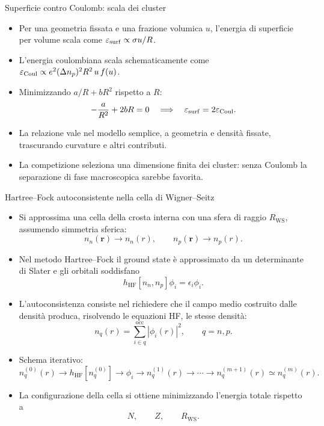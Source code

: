 \begin{frame}[t]{Superficie contro Coulomb: scala dei cluster}
\small
\begin{itemize}
\item Per una geometria fissata e una frazione volumica \(u\), l'energia di superficie per volume scala come
\(\varepsilon_{\rm surf}\propto \sigma u/R\).
\item L'energia coulombiana scala schematicamente come
\(\varepsilon_{\rm Coul}\propto e^2(\Delta n_p)^2 R^2\,u\,f(u)\).
\item Minimizzando \(a/R+bR^2\) rispetto a \(R\):
\[
-\frac{a}{R^2}+2bR=0
\quad\Longrightarrow\quad
\varepsilon_{\rm surf}=2\varepsilon_{\rm Coul}.
\]
\item La relazione vale nel modello semplice, a geometria e densità fissate, trascurando curvature e altri contributi.
\item La competizione seleziona una dimensione finita dei cluster: senza Coulomb la separazione di fase macroscopica sarebbe favorita.
\end{itemize}
\end{frame}

\begin{frame}{Hartree--Fock autoconsistente nella cella di Wigner--Seitz}

\small
\begin{itemize}
  \item Si approssima una cella della crosta interna con una sfera di raggio
  \(R_{\mathrm{WS}}\), assumendo simmetria sferica:
  \[
    n_n(\mathbf r)\to n_n(r),
    \qquad
    n_p(\mathbf r)\to n_p(r).
  \]

  \item Nel metodo Hartree--Fock il ground state è approssimato da un determinante
  di Slater e gli orbitali soddisfano
  \[
    h_{\mathrm{HF}}[n_n,n_p]\phi_i=\epsilon_i\phi_i .
  \]

  \item L'autoconsistenza consiste nel richiedere che il campo medio costruito
  dalle densità produca, risolvendo le equazioni HF, le stesse densità:
  \[
    n_q(r)=\sum_{i\in q}^{\mathrm{occ}}|\phi_i(r)|^2,
    \qquad q=n,p .
  \]

  \item Schema iterativo:
  \[
  n_q^{(0)}(r)
  \rightarrow
  h_{\mathrm{HF}}[n_q^{(0)}]
  \rightarrow
  \phi_i
  \rightarrow
  n_q^{(1)}(r)
  \rightarrow
  \cdots
  \rightarrow
  n_q^{(m+1)}(r)\simeq n_q^{(m)}(r).
  \]

  \item La configurazione della cella si ottiene minimizzando l'energia totale
  rispetto a
  \[
    N,\qquad Z,\qquad R_{\mathrm{WS}} .
  \]
\end{itemize}

\end{frame}

